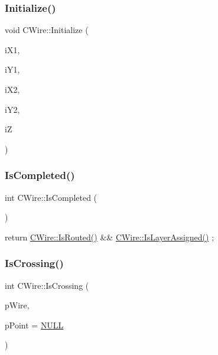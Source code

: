 \mbox{\label{classCWire_ab32c9734c1bb70f9aecb90be922d63fe}} 
\subsubsection{\texorpdfstring{Initialize()}{Initialize()}\hspace{0.1cm}{\footnotesize\ttfamily [3/3]}}
{\footnotesize\ttfamily void C\+Wire\+::\+Initialize (\begin{DoxyParamCaption}\item[{int}]{i\+X1,  }\item[{int}]{i\+Y1,  }\item[{int}]{i\+X2,  }\item[{int}]{i\+Y2,  }\item[{int}]{iZ }\end{DoxyParamCaption})}

\mbox{\label{classCWire_a1b37fb9ea32af4a838620a368b9f3824}} 
\subsubsection{\texorpdfstring{IsCompleted()}{IsCompleted()}}
{\footnotesize\ttfamily int C\+Wire\+::\+Is\+Completed (\begin{DoxyParamCaption}{ }\end{DoxyParamCaption})}



return \mbox{\hyperlink{classCWire_a8edc31661e3d037da712ad64cd7b8b5b}{C\+Wire\+::\+Is\+Routed()}} \&\& \mbox{\hyperlink{classCWire_a58444c1e0db9838445654d85a3405741}{C\+Wire\+::\+Is\+Layer\+Assigned()}} ; 

\mbox{\label{classCWire_a961f580e533277ae6c618f52f4c105e0}} 
\subsubsection{\texorpdfstring{IsCrossing()}{IsCrossing()}}
{\footnotesize\ttfamily int C\+Wire\+::\+Is\+Crossing (\begin{DoxyParamCaption}\item[{\mbox{\hyperlink{classCWire}{C\+Wire}} $\ast$}]{p\+Wire,  }\item[{\mbox{\hyperlink{classCPoint}{C\+Point}} $\ast$}]{p\+Point = {\ttfamily \mbox{\hyperlink{BoxRouter_8h_a070d2ce7b6bb7e5c05602aa8c308d0c4}{N\+U\+LL}}} }\end{DoxyParamCaption})}

